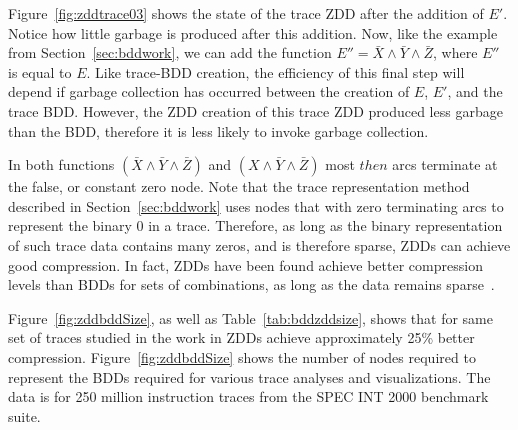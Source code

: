 {Figure~\ref{fig:zddtrace03} shows the state of the trace ZDD after the addition of $E'$.  Notice how little garbage is produced after this addition.  Now, like the example from Section~\ref{sec:bddwork}, we can add the function $E''=\bar{X}\land\bar{Y}\land\bar{Z}$, where $E''$ is equal to $E$.  Like trace-BDD creation, the efficiency of this final step will depend if garbage collection has occurred between the creation of $E$, $E'$, and the trace BDD.  However, the ZDD creation of this trace ZDD produced less garbage than the BDD, therefore it is less likely to invoke garbage collection.

In both functions $(\bar{X}\land\bar{Y}\land\bar{Z})$ and $(X\land\bar{Y}\land\bar{Z})$ most $then$ arcs terminate at the false, or constant zero node. Note that the trace representation method described in Section~\ref{sec:bddwork} uses nodes that with zero terminating arcs to represent the binary $0$ in a trace.  Therefore, as long as the binary representation of such trace data contains many zeros, and is therefore sparse, ZDDs can achieve good compression. In fact, ZDDs have been found achieve better compression levels than BDDs for sets of combinations, as long as the data remains sparse~\cite{minato:01:STTT}.

Figure~\ref{fig:zddbddSize}, as well as Table~\ref{tab:bddzddsize}, shows that for same set of traces studied in the work in \cite{price:08:pact} ZDDs achieve approximately 25\% better compression.  Figure~\ref{fig:zddbddSize} shows the number of nodes required to represent the BDDs required for various trace analyses and visualizations.  The data is for 250 million instruction traces from the SPEC INT 2000 benchmark suite.

}
